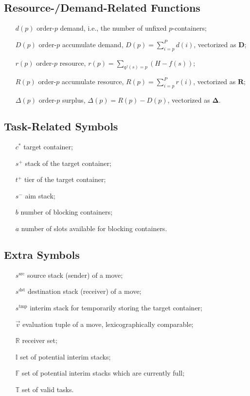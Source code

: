 \documentclass{article}
\newcommand{\mss}{s^\mathrm{src}}
\newcommand{\mds}{s^\mathrm{dst}}
\newcommand{\mts}{s^\mathrm{tmp}}
\begin{document}
\subsection{Resource-{\slash}Demand-Related Functions}
\begin{enumerate}[noitemsep, align=LabelCenter,labelwidth=\cpmpmylongest,leftmargin=!]
\item[$d(p)$] order-$p$ demand, i.e., the number of unfixed $p$-containers;
\item[$D(p)$] order-$p$ accumulate demand, $D(p)=\sum_{i=p}^P d(i)$, vectorized as $\boldsymbol{D}$;
\item[$r(p)$] order-$p$ resource, $r(p)=\sum_{q^f(s)=p} (H-f(s))$;
\item[$R(p)$] order-$p$ accumulate resource, $R(p)=\sum_{i=p}^P r(i)$, vectorized as $\boldsymbol{R}$;
\item[$\Delta(p)$] order-$p$ surplus, $\Delta(p)=R(p)-D(p)$, vectorized as $\boldsymbol{\Delta}$.
\end{enumerate}

\subsection{Task-Related Symbols}
\begin{enumerate}[noitemsep, align=LabelCenter,labelwidth=\cpmpmylongest,leftmargin=!]
\item[$c^*$] target container;
\item[$s^+$] stack of the target container;
\item[$t^+$] tier of the target container;
\item[$s^-$] aim stack;
\item[$b$] number of blocking containers;
\item[$a$] number of slots available for blocking containers.
\end{enumerate}

\subsection{Extra Symbols}
\begin{enumerate}[noitemsep, align=LabelCenter,labelwidth=\cpmpmylongest,leftmargin=!]
\item[$\mss$] source stack (sender) of a move;
\item[$\mds$] destination stack (receiver) of a move;
\item[$\mts$] interim stack for temporarily storing the target container;
\item[$\vec{v}$] evaluation tuple of a move, lexicographically comparable;\item[$\mathbb{R}$] receiver set;
\item[$\mathbb{I}$] set of potential interim stacks;
\item[$\mathbb{F}$] set of potential interim stacks which are  currently full;
\item[$\mathbb{T}$] set of valid tasks.
\end{enumerate}
\end{document}
